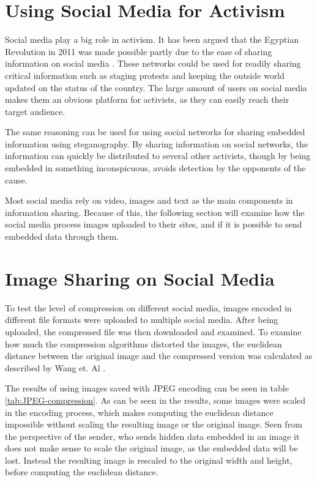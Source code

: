 \clearpage
\section{Using Social Media for Activism}
\label{sec:socialmedia}
Social media play a big role in activism.
It has been argued that the Egyptian Revolution in 2011 was made possible partly due to the ease of sharing information on social media \citep{IJoC1242}. 
These networks could be used for readily sharing critical information such as staging protests and keeping the outside world updated on the status of the country.
The large amount of users on social media makes them an obvious platform for activists, as they can easily reach their target audience. 

The same reasoning can be used for using social networks for sharing embedded information using steganography. 
By sharing information on social networks, the information can quickly be distributed to several other activists, though by being embedded in something inconspicuous, avoids detection by the opponents of the cause.

Most social media rely on video, images and text as the main components in information sharing.
Because of this, the following section will examine how the social media process images uploaded to their sites, and if it is possible to send embedded data through them.

\section{Image Sharing on Social Media}
To test the level of compression on different social media, images encoded in different file formats were uploaded to multiple social media. 
After being uploaded, the compressed file was then downloaded and examined.
To examine how much the compression algorithms distorted the images, the euclidean distance between the original image and the compressed version was calculated as described by Wang et. Al \citep{Wang2005}.

The results of using images saved with JPEG encoding can be seen in table \ref{tab:JPEG-compression}. 
As can be seen in the results, some images were scaled in the encoding process, which makes computing the euclidean distance impossible without scaling the resulting image or the original image. Seen from the perspective of the sender, who sends hidden data embedded in an image it does not make sense to scale the original image, as the embedded data will be lost. Instead the resulting image is rescaled to the original width and height, before computing the euclidean distance.

